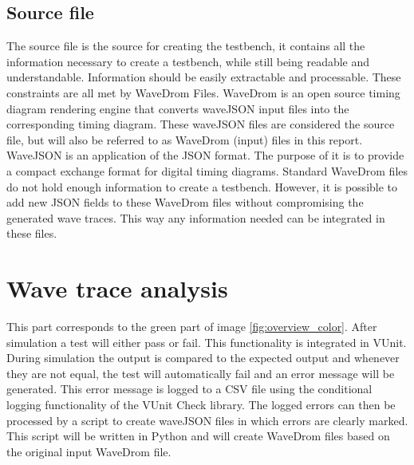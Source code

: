 \subsection{Source file}
The source file is the source for creating the testbench, it contains all the information necessary to create a testbench, while still being readable and understandable. Information should be easily extractable and processable. These constraints are all met by WaveDrom Files.
\npar
WaveDrom is an open source timing diagram rendering engine that converts waveJSON input files into the corresponding timing diagram. These waveJSON files are considered the source file, but will also be referred to as WaveDrom (input) files in this report.
\npar
WaveJSON \cite{wavejson}
 is an application of the JSON format. The purpose of it is to provide a compact exchange format for digital timing diagrams.
\npar
Standard WaveDrom files do not hold enough information to create a testbench. However, it is possible to add new JSON fields to these WaveDrom files without compromising the generated wave traces. This way any information needed can be integrated in these files.
\section{Wave trace analysis}
This part corresponds to the green part of image \ref{fig:overview_color}. After simulation a test will either pass or fail. This functionality is integrated in VUnit. During simulation the output is compared to the expected output and whenever they are not equal, the test will automatically fail and an error message will be generated. This error message is logged to a CSV file using the conditional logging functionality of the VUnit Check library.
\npar
The logged errors can then be processed by a script to create waveJSON files in which errors are clearly marked. This script will be written in Python and will create WaveDrom files based on the original input WaveDrom file.